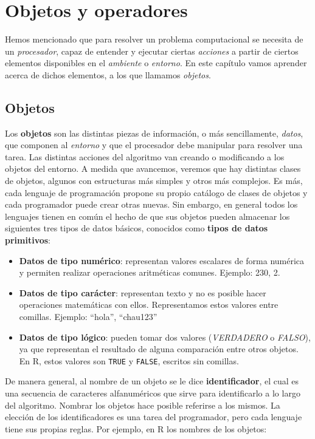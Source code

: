 \documentclass[
]{book}
\providecommand{\tightlist}{%
  \setlength{\itemsep}{0pt}\setlength{\parskip}{0pt}}
\begin{document}
\hypertarget{objetos-y-operadores}{%
\chapter{Objetos y operadores}\label{objetos-y-operadores}}

Hemos mencionado que para resolver un problema computacional se necesita de un \emph{procesador}, capaz de entender y ejecutar ciertas \emph{acciones} a partir de ciertos elementos disponibles en el \emph{ambiente} o \emph{entorno}. En este capítulo vamos aprender acerca de dichos elementos, a los que llamamos \emph{objetos}.

\hypertarget{objetos}{%
\section{Objetos}\label{objetos}}

Los \textbf{objetos} son las distintas piezas de información, o más sencillamente, \emph{datos}, que componen al \emph{entorno} y que el procesador debe manipular para resolver una tarea. Las distintas acciones del algoritmo van creando o modificando a los objetos del entorno. A medida que avancemos, veremos que hay distintas clases de objetos, algunos con estructuras más simples y otros más complejos. Es más, cada lenguaje de programación propone su propio catálogo de clases de objetos y cada programador puede crear otras nuevas. Sin embargo, en general todos los lenguajes tienen en común el hecho de que sus objetos pueden almacenar los siguientes tres tipos de datos básicos, conocidos como \textbf{tipos de datos primitivos}:

\begin{itemize}
\tightlist
\item
  \textbf{Datos de tipo numérico}: representan valores escalares de forma numérica y permiten realizar operaciones aritméticas comunes. Ejemplo: 230, 2.
\item
  \textbf{Datos de tipo carácter}: representan texto y no es posible hacer operaciones matemáticas con ellos. Representamos estos valores entre comillas. Ejemplo: ``hola'', ``chau123''
\item
  \textbf{Datos de tipo lógico}: pueden tomar dos valores (\emph{VERDADERO} o \emph{FALSO}), ya que representan el resultado de alguna comparación entre otros objetos. En R, estos valores son \texttt{TRUE} y \texttt{FALSE}, escritos sin comillas.
\end{itemize}

De manera general, al nombre de un objeto se le dice \textbf{identificador}, el cual es una secuencia de caracteres alfanuméricos que sirve para identificarlo a lo largo del algoritmo. Nombrar los objetos hace posible referirse a los mismos. La elección de los identificadores es una tarea del programador, pero cada lenguaje tiene sus propias reglas. Por ejemplo, en R los nombres de los objetos:
\end{document}
